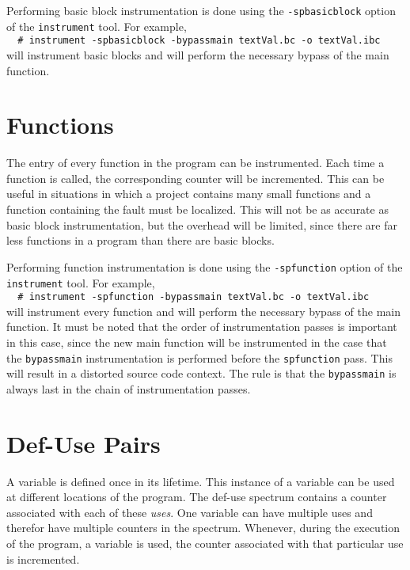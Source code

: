 	Performing basic block instrumentation is done using the \verb|-spbasicblock| option of the \verb|instrument| tool.
	For example,\\
	\verb|  # instrument -spbasicblock -bypassmain textVal.bc -o textVal.ibc|\\
	will instrument basic blocks and will perform the necessary bypass of the main function.

	

\section{Functions}

	The entry of every function in the program can be instrumented.
	Each time a function is called, the corresponding counter will be incremented.
	This can be useful in situations in which a project contains many small functions
	and a function containing the fault must be localized.
	This will not be as accurate as basic block instrumentation, 
	but the overhead will be limited, since there are far less functions
	in a program than there are basic blocks.
	
	Performing function instrumentation is done using the \verb|-spfunction| option of the \verb|instrument| tool.
	For example,\\
	\verb|  # instrument -spfunction -bypassmain textVal.bc -o textVal.ibc|\\
	will instrument every function and will perform the necessary bypass of the main function.
	It must be noted that the order of instrumentation passes is important in this case,
	since the new main function will be instrumented in the case that the \verb|bypassmain|
	instrumentation is performed before the \verb|spfunction| pass.
	This will result in a distorted source code context.
	The rule is that the \verb|bypassmain| is always last in the chain of instrumentation passes.


\section{Def-Use Pairs}

	A variable is defined once in its lifetime.
	This instance of a variable can be used at different locations of the program.
	The def-use spectrum contains a counter associated with each of these \emph{uses}.
	One variable can have multiple uses and therefor have multiple counters in the spectrum.
	Whenever, during the execution of the program, a variable is used, 
	the counter associated with that particular use is incremented.
	

